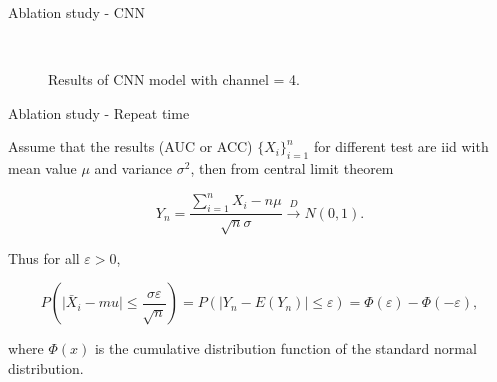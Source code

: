\documentclass{beamer}
\begin{document}
\begin{frame}{Ablation study - CNN}

    \begin{figure}[H]
         \\
        \caption{Results of CNN model with channel = 4.}
    \end{figure}

\end{frame}

\begin{frame}{Ablation study - Repeat time}

    Assume that the results (AUC or ACC) $\{X_i\}_{i=1}^n$ for different test are iid with mean value $\mu$ and variance $\sigma^2$, then from central limit theorem

    $$
        Y_n = \frac{\sum_{i=1}^n X_i - n \mu}{\sqrt{n} \sigma} \xrightarrow{D} N(0, 1).
    $$

    Thus for all $\varepsilon > 0$,

    $$
        P\left(\vert \bar{X}_i - mu \vert \leq \frac{\sigma \varepsilon}{\sqrt{n}}\right) = P(\vert Y_n - E(Y_n) \vert \leq \varepsilon) = \varPhi(\varepsilon) - \varPhi(-\varepsilon),
    $$

    where $\varPhi(x)$ is the cumulative distribution function of the standard normal distribution.

\end{frame}
\end{document}
